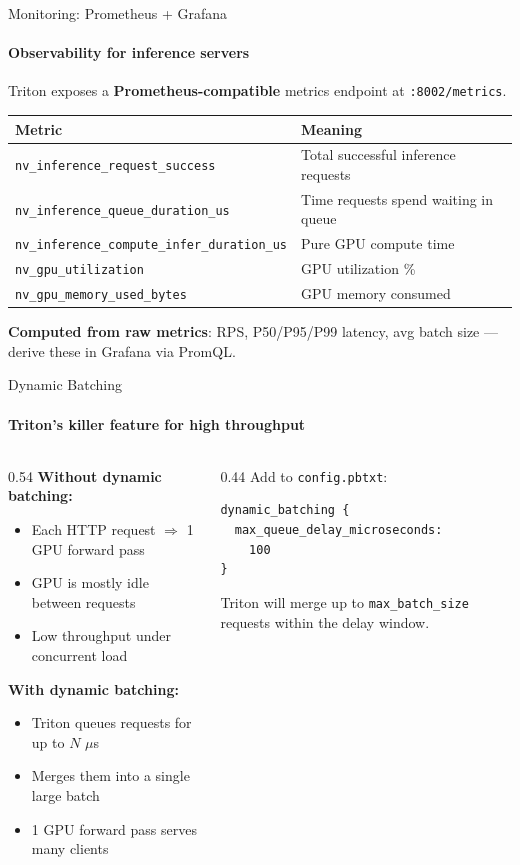 \documentclass[aspectratio=169]{beamer}
\begin{document}
\begin{frame}[t]{Monitoring: Prometheus + Grafana}
\framesubtitle{Observability for inference servers}
Triton exposes a \textbf{Prometheus-compatible} metrics endpoint at \texttt{:8002/metrics}.
\vspace{2mm}
\begin{tabular}{@{}p{6.0cm}p{6.8cm}@{}}
\toprule
Metric & Meaning \\
\midrule
\texttt{nv\_inference\_request\_success} & Total successful inference requests \\
\texttt{nv\_inference\_queue\_duration\_us} & Time requests spend waiting in queue \\
\texttt{nv\_inference\_compute\_infer\_duration\_us} & Pure GPU compute time \\
\texttt{nv\_gpu\_utilization} & GPU utilization \% \\
\texttt{nv\_gpu\_memory\_used\_bytes} & GPU memory consumed \\
\bottomrule
\end{tabular}

\textbf{Computed from raw metrics}: RPS, P50/P95/P99 latency, avg batch size --- derive these in Grafana via PromQL.
\end{frame}


\begin{frame}[t,fragile]{Dynamic Batching}
\framesubtitle{Triton's killer feature for high throughput}
\begin{columns}[T,onlytextwidth]
    \begin{column}{0.54\textwidth}
        \textbf{Without dynamic batching:}
        \begin{itemize}
            \item Each HTTP request $\Rightarrow$ 1 GPU forward pass
            \item GPU is mostly idle between requests
            \item Low throughput under concurrent load
        \end{itemize}
        \vspace{3mm}
        \textbf{With dynamic batching:}
        \begin{itemize}
            \item Triton queues requests for up to $N$ $\mu$s
            \item Merges them into a single large batch
            \item 1 GPU forward pass serves many clients
        \end{itemize}
    \end{column}
    \begin{column}{0.44\textwidth}
        Add to \texttt{config.pbtxt}:
\begin{lstlisting}[basicstyle=\small\ttfamily]
dynamic_batching {
  max_queue_delay_microseconds:
    100
}
\end{lstlisting}
        Triton will merge up to \texttt{max\_batch\_size} requests within the delay window.
    \end{column}
\end{columns}
\end{frame}
\end{document}
